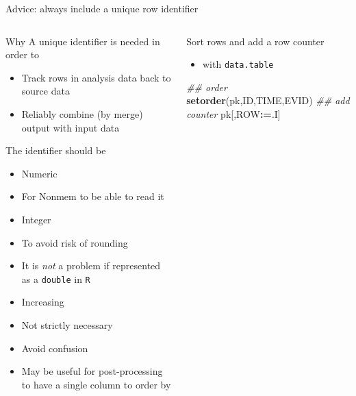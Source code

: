 \documentclass[
  8pt,
  ignorenonframetext,
  aspectratio=169]{beamer}
\newenvironment{Shaded}{\begin{snugshade}}{\end{snugshade}}
\newcommand{\CommentTok}[1]{\textcolor[rgb]{0.56,0.35,0.01}{\textit{#1}}}
\newcommand{\ErrorTok}[1]{\textcolor[rgb]{0.64,0.00,0.00}{\textbf{#1}}}
\newcommand{\KeywordTok}[1]{\textcolor[rgb]{0.13,0.29,0.53}{\textbf{#1}}}
\newcommand{\NormalTok}[1]{#1}
\newcommand{\OperatorTok}[1]{\textcolor[rgb]{0.81,0.36,0.00}{\textbf{#1}}}
\providecommand{\tightlist}{%
  \setlength{\itemsep}{0pt}\setlength{\parskip}{0pt}}
\begin{document}
\begin{frame}[fragile]{Advice: always include a unique row identifier}
\protect\hypertarget{advice-always-include-a-unique-row-identifier}{}
\begin{columns}[T]
\begin{column}{0.48\textwidth}
\begin{block}{Why}
\protect\hypertarget{why}{}
A unique identifier is needed in order to

\begin{itemize}
\item
  Track rows in analysis data back to source data
\item
  Reliably combine (by merge) output with input data
\end{itemize}
\end{block}

\begin{block}{The identifier should be}
\protect\hypertarget{the-identifier-should-be}{}
\begin{itemize}
\item
  Numeric
\item
  For Nonmem to be able to read it
\item
  Integer
\item
  To avoid risk of rounding
\item
  It is \emph{not} a problem if represented as a \texttt{double} in
  \texttt{R}
\item
  Increasing
\item
  Not strictly necessary
\item
  Avoid confusion
\item
  May be useful for post-processing to have a single column to order by
\end{itemize}
\end{block}
\end{column}

\begin{column}{0.48\textwidth}
\begin{block}{Sort rows and add a row counter}
\protect\hypertarget{sort-rows-and-add-a-row-counter}{}
\begin{itemize}
\tightlist
\item
  with \texttt{data.table}
\end{itemize}

\begin{Shaded}
\begin{Highlighting}[]
\CommentTok{\#\# order}
\KeywordTok{setorder}\NormalTok{(pk,ID,TIME,EVID)}
\CommentTok{\#\# add counter}
\NormalTok{pk[,ROW}\OperatorTok{:}\ErrorTok{=}\NormalTok{.I]}
\end{Highlighting}
\end{Shaded}


\end{block}
\end{column}
\end{columns}
\end{frame}
\end{document}
